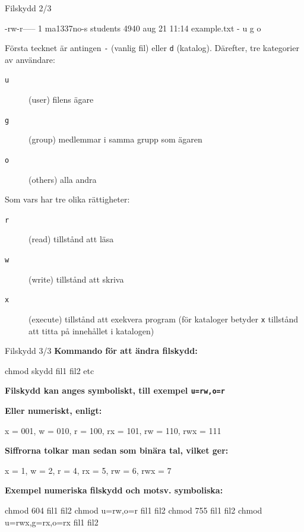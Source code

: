 \begin{Slide}{Filskydd 2/3}
\begin{Code}[language=]
-rw-r-----  1 ma1337no-s  students  4940 aug 21 11:14 example.txt
- u  g  o
\end{Code}

    Första tecknet är antingen \texttt{-} (vanlig fil) eller \texttt{d} (katalog).
    Därefter, tre kategorier av användare:

    \begin{description}
        \item[\texttt{u}] (user) filens ägare
        \item[\texttt{g}] (group) medlemmar i samma grupp som ägaren
        \item[\texttt{o}] (others) alla andra
    \end{description}

    Som vars har tre olika rättigheter:

    \begin{description}
        \item[\texttt{r}] (read) tillstånd att läsa
        \item[\texttt{w}] (write) tillstånd att skriva
        \item[\texttt{x}] (execute) tillstånd att exekvera program (för kataloger betyder \texttt{x} tillstånd att titta på innehållet i katalogen)
    \end{description}

\end{Slide}
\begin{Slide}{Filskydd 3/3}
\textbf{Kommando för att ändra filskydd:}

\begin{Code}[language=]
    chmod skydd fil1 fil2 etc
\end{Code}

\noindent\textbf{Filskydd kan anges symboliskt, till exempel \texttt{u=rw,o=r}}

\halfblankline
\noindent\textbf{Eller numeriskt, enligt:}

\begin{Code}[language=]
    x = 001, w = 010, r = 100, rx = 101, rw = 110, rwx = 111
\end{Code}


\textbf{Siffrorna tolkar man sedan som binära tal, vilket ger:}

\begin{Code}[language=]
    x = 1, w = 2, r = 4, rx = 5, rw = 6, rwx = 7
\end{Code}


\noindent\textbf{Exempel numeriska filskydd och motsv. symboliska:}

\begin{Code}[language=]
 chmod 604 fil1 fil2         chmod u=rw,o=r fil1 fil2   
 chmod 755 fil1 fil2         chmod u=rwx,g=rx,o=rx fil1 fil2
\end{Code}
\end{Slide}
